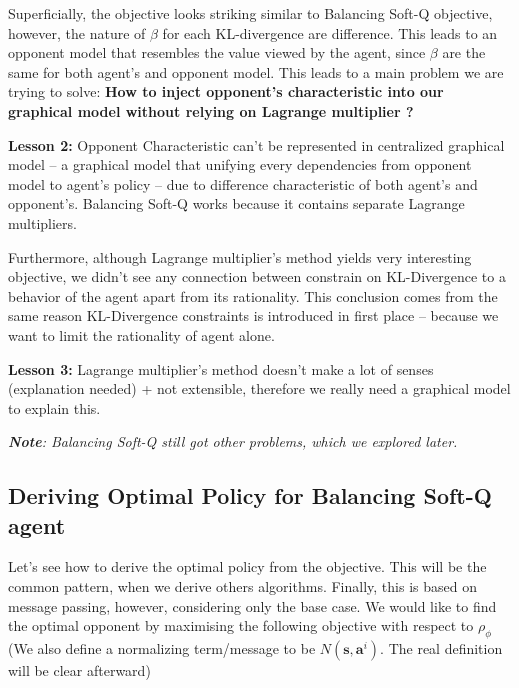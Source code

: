Superficially, the objective looks striking similar to Balancing Soft-Q objective, however, the nature of $\beta$ for each KL-divergence are difference.  This leads to an opponent model that resembles the value viewed by the agent, since $\beta$ are the same for both agent's and opponent model. This leads to a main problem we are trying to solve: \textbf{How to inject opponent's characteristic into our graphical model without relying on Lagrange multiplier ?}

\begin{tcolorbox}
\textbf{Lesson 2: } Opponent Characteristic can't be represented in centralized graphical model -- a graphical model that unifying every dependencies from opponent model to agent's policy -- due to difference characteristic of both agent's and opponent's. Balancing Soft-Q works because it contains separate Lagrange multipliers.
\end{tcolorbox}

Furthermore, although Lagrange multiplier's method yields very interesting objective, we didn't see any connection between constrain on KL-Divergence to a behavior of the agent apart from its rationality. This conclusion comes from the same reason KL-Divergence constraints is introduced in first place -- because we want to limit the rationality of agent alone. 

\begin{tcolorbox}
\textbf{Lesson 3: } Lagrange multiplier's method doesn't make a lot of senses (explanation needed) + not extensible, therefore we really need a graphical model to explain this.
\end{tcolorbox}
\emph{\textbf{Note}: Balancing Soft-Q still got other problems, which we explored later.}  

\subsection{Deriving Optimal Policy for Balancing Soft-Q agent}
Let's see how to derive the optimal policy from the objective. This will be the common pattern, when we derive others algorithms. Finally, this is based on \cite{levine2018reinforcement} message passing, however, considering only the base case. We would like to find the optimal opponent by maximising the following objective with respect to $\rho_{\phi}$ (We also define a normalizing term/message to be $N(\boldsymbol{s}, \boldsymbol{a}^i)$. The real definition will be clear afterward)

